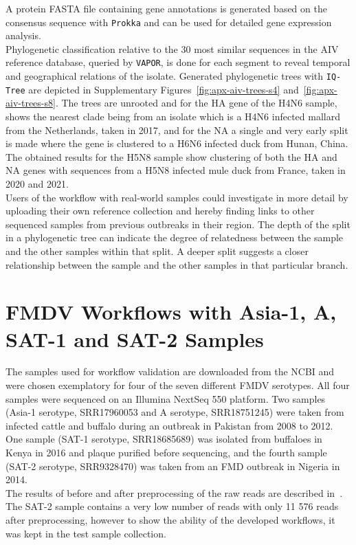A protein FASTA file containing gene annotations is generated based on the consensus sequence with \texttt{Prokka} and can be used for detailed gene expression analysis. \\
Phylogenetic classification relative to the 30 most similar sequences in the \ac{AIV} reference database, queried by \texttt{VAPOR}, is done for each segment to reveal temporal and geographical relations of the isolate. Generated phylogenetic trees with \texttt{IQ-Tree} are depicted in Supplementary Figures~\ref{fig:apx-aiv-trees-s4} and~\ref{fig:apx-aiv-trees-s8}. The trees are unrooted and for the \ac{HA} gene of the H4N6 sample, shows the nearest clade being from an isolate which is a H4N6 infected mallard from the Netherlands, taken in 2017, and for the \ac{NA} a single and very early split is made where the gene is clustered to a H6N6 infected duck from Hunan, China. The obtained results for the H5N8 sample show clustering of both the \ac{HA} and \ac{NA} genes with sequences from a H5N8 infected mule duck from France, taken in 2020 and 2021.\\
Users of the workflow with real-world samples could investigate in more detail by uploading their own reference collection and hereby finding links to other sequenced samples from previous outbreaks in their region. The depth of the split in a phylogenetic tree can indicate the degree of relatedness between the sample and the other samples within that split. A deeper split suggests a closer relationship between the sample and the other samples in that particular branch.

\section{FMDV Workflows with Asia-1, A, SAT-1 and SAT-2 Samples}
The samples used for workflow validation are downloaded from the \ac{NCBI} and were chosen exemplatory for four of the seven different \ac{FMDV} serotypes. All four samples were sequenced on an Illumina NextSeq 550 platform. Two samples (Asia-1 serotype, SRR17960053 and A serotype, SRR18751245) were taken from infected cattle and buffalo during an outbreak in Pakistan from 2008 to 2012. One sample (SAT-1 serotype, SRR18685689) was isolated from buffaloes in Kenya in 2016 and plaque purified before sequencing, and the fourth sample (SAT-2 serotype, SRR9328470) was taken from an \ac{FMD} outbreak in Nigeria in 2014. \\
The results of before and after preprocessing of the raw reads are described in~. The SAT-2 sample contains a very low number of reads with only 11 576 reads after preprocessing, however to show the ability of the developed workflows, it was kept in the test sample collection. 
\\

